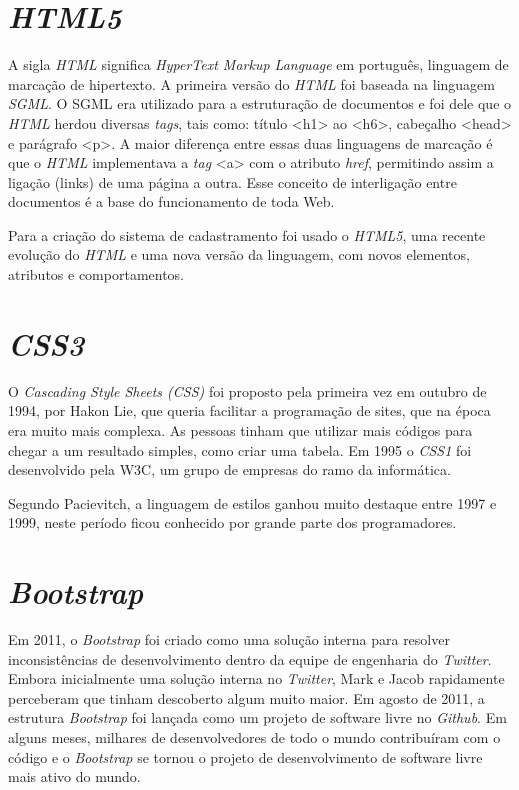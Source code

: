 \section{\textit{HTML5}}
A sigla \textit{HTML} significa \textit{HyperText Markup Language} em português, linguagem de marcação de hipertexto. A primeira versão do \textit{HTML} foi baseada na linguagem \textit{SGML}. O SGML era utilizado para a estruturação de documentos e foi dele que o \textit{HTML} herdou diversas \textit{tags}, tais como: título <h1> ao <h6>, cabeçalho <head> e parágrafo <p>. A maior diferença entre essas duas linguagens de marcação é que o \textit{HTML} implementava a \textit{tag} <a> com o atributo \textit{href}, permitindo assim a ligação (links) de uma página a outra. Esse conceito de interligação entre documentos é a base do funcionamento de toda Web. \cite{html}

Para a criação do sistema de cadastramento foi usado o \textit{HTML5}, uma recente evolução do \textit{HTML} e uma nova versão da linguagem, com novos elementos, atributos e comportamentos.

\section{\textit{CSS3}}
O \textit{Cascading Style Sheets (CSS)} foi proposto pela primeira vez em outubro de 1994, por Hakon Lie, que queria facilitar a programação de sites, que na época era muito mais complexa. As pessoas tinham que utilizar mais códigos para chegar a um resultado simples, como criar uma tabela.
Em 1995 o \textit{CSS1} foi desenvolvido pela W3C, um grupo de empresas do ramo da informática. \cite{css}

Segundo Pacievitch, a linguagem de estilos ganhou muito destaque entre 1997 e 1999, neste período ficou conhecido por grande parte dos programadores.

\section{\textit{Bootstrap}}
Em 2011, o \textit{Bootstrap} foi criado como uma solução interna para resolver inconsistências de desenvolvimento dentro da equipe de engenharia do \textit{Twitter}. 
Embora inicialmente uma solução interna no \textit{Twitter}, Mark e Jacob rapidamente perceberam que tinham descoberto algum muito maior. Em agosto de 2011, a estrutura \textit{Bootstrap} foi lançada como um projeto de software livre no \textit{Github}. Em alguns meses, milhares de desenvolvedores de todo o mundo contribuíram com o código e o \textit{Bootstrap} se tornou o projeto de desenvolvimento de software livre mais ativo do mundo. \cite{bootstrap}

